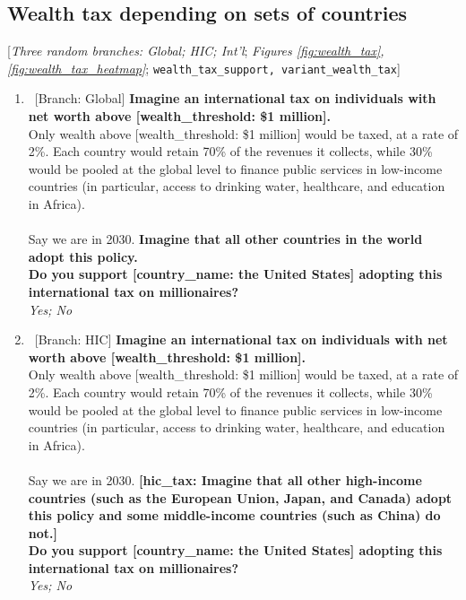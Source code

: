  \subsection*{Wealth tax depending on sets of countries} 
 [\textit{Three random branches: Global; HIC; Int'l}; \textit{Figures \ref{fig:wealth_tax}, \ref{fig:wealth_tax_heatmap}}; 
 \verb|wealth_tax_support, variant_wealth_tax|] 
 \begin{enumerate}[resume] %
\item ~[Branch: Global] \label{q:global_tax_support} \textbf{Imagine an international tax on individuals with net worth above [wealth\_threshold: \$1 million].~}\\Only wealth above [wealth\_threshold: \$1 million] would be taxed, at a rate of 2\%. Each country would retain 70\% of the revenues it collects, while 30\% would be pooled at the global level to finance public services in low-income countries (in particular, access to drinking water, healthcare, and education in Africa). \\\\Say we are in 2030. \textbf{Imagine that all other countries in the world adopt this policy. \\Do you support [country\_name: the United States] adopting this international tax on millionaires?}
  \\ \textit{Yes; No}

\item ~[Branch: HIC] \label{q:hic_tax_support} \textbf{Imagine an international tax on individuals with net worth above [wealth\_threshold: \$1 million].~}\\Only wealth above [wealth\_threshold: \$1 million] would be taxed, at a rate of 2\%. Each country would retain 70\% of the revenues it collects, while 30\% would be pooled at the global level to finance public services in low-income countries (in particular, access to drinking water, healthcare, and education in Africa). \\\\Say we are in 2030. \textbf{[hic\_tax: Imagine that all other high-income countries (such as the European Union, Japan, and Canada) adopt this policy and some middle-income countries (such as China) do not.]}\textbf{~\\Do you support [country\_name: the United States] adopting this international tax on millionaires?}
  \\ \textit{Yes; No}


\end{enumerate}

